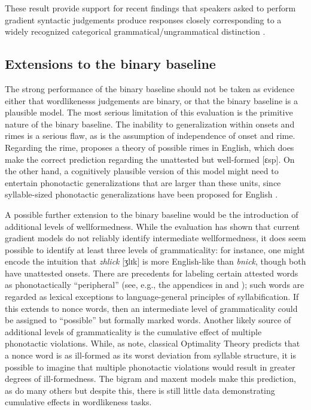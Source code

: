 These result provide support for recent findings that speakers asked to perform gradient syntactic judgements produce responses closely corresponding to a widely recognized categorical grammatical/ungrammatical distinction \citep{Sprouse2007}.

\subsection{Extensions to the binary baseline}

The strong performance of the binary baseline should not be taken as evidence either that wordlikenesss judgements are binary, or that the binary baseline is a plausible model. The most serious limitation of this evaluation is the primitive nature of the binary baseline. The inability to generalization within onsets and rimes is a serious flaw, as is the assumption of independence of onset and rime. Regarding the rime, \citet{Borowsky1989} proposes a theory of possible rimes in English, which does make the correct prediction regarding the unattested but well-formed [ɛsp]. On the other hand, a cognitively plausible version of this model might need to entertain phonotactic generalizations that are larger than these units, since syllable-sized phonotactic generalizations have been proposed for English \citep[e.g.,][]{Berkley1994a,Berkley1994b,Coetzee2008b,Fudge1969}. 

A possible further extension to the binary baseline would be the introduction of additional levels of wellformedness. While the evaluation has shown that current gradient models do not reliably identify intermediate wellformedness, it does seem possible to identify at least three levels of grammaticality: for instance, one might encode the intuition that \emph{zhlick} [ʒlɪk] is more English-like than \emph{bnick}, though both have unattested onsets. There are precedents for labeling certain attested words as phonotactically ``peripheral'' (see, e.g., the appendices in \citealt{Myers1987} and \citealt{Borowsky1989}); such words are regarded as lexical exceptions to language-general principles of syllabification. If this extends to nonce words, then an intermediate level of grammaticality could be assigned to ``possible'' but formally marked words. Another likely source of additional levels of grammaticality is the cumulative effect of multiple phonotactic violations. While, as \citet{Coleman1997} note, classical Optimality Theory predicts that a nonce word is as ill-formed as its worst deviation from syllable structure, it is possible to imagine that multiple phonotactic violations would result in greater degrees of ill-formedness. The bigram and maxent models make this prediction, as do many others \citep[e.g.,][]{Legendre1990,Levelt2000,Albright2008,Anttila2008,Pater2009b} but despite this, there is still little data demonstrating cumulative effects in wordlikeness tasks.

